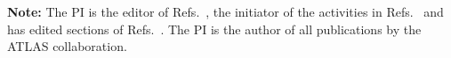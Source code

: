 \documentclass[11pt,a4paper]{article}
\begin{document}
\clearpage




{\bf Note:} The PI is the editor of Refs.~\cite{Boveia:2018yeb,Abercrombie:2015wmb,Aaboud:2018fzt,Aaboud:2019zxd,Doglioni:2019fza}, the initiator of the activities in Refs.~\cite{DMWGWebsite,iDMEu} and has edited sections of Refs.~\cite{Strategy:2019vxc,Alves:2017she,Aaboud:2016leb}. The PI is the author of all publications by the ATLAS collaboration.
\end{document}
